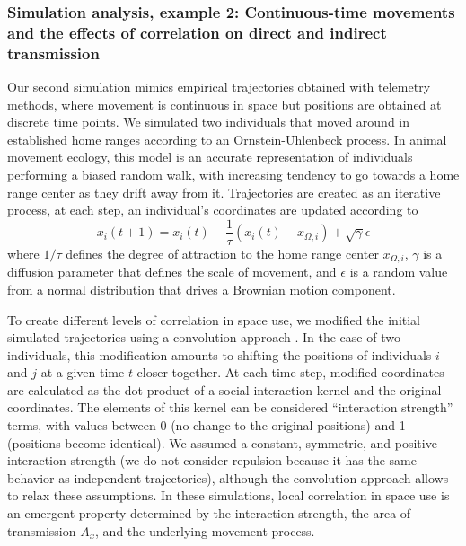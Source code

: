 \documentclass[letterpaper]{article}
\begin{document}
\subsubsection*{Simulation analysis, example 2: Continuous-time movements and the effects of correlation on direct and indirect transmission}

Our second simulation mimics empirical trajectories obtained with telemetry methods, where movement is continuous in space but positions are obtained at discrete time points. We simulated two individuals that moved around in established home ranges according to an Ornstein-Uhlenbeck process. In animal movement ecology, this model is an accurate representation of individuals performing a biased random walk, with increasing tendency to go towards a home range center as they drift away from it. Trajectories are created as an iterative process, at each step, an individual's coordinates are updated according to 
\begin{equation}
	x_i(t+1)=x_i(t)-\frac{1}{\tau}(x_i(t)-x_{\Omega,i})+\sqrt{\gamma}\epsilon
\end{equation}
where $1/\tau$ defines the degree of attraction to the home range center $x_{\Omega,i}$, $\gamma$ is a diffusion parameter that defines the scale of movement, and $\epsilon$ is a random value from a normal distribution that drives a Brownian motion component. 

To create different levels of correlation in space use, we modified the initial simulated trajectories using a convolution approach \citep{Scharf2018}. In the case of two individuals, this modification amounts to shifting the positions of individuals $i$ and $j$ at a given time $t$ closer together. At each time step, modified coordinates are calculated as the dot product of a social interaction kernel and the original coordinates. The elements of this kernel can be considered ``interaction strength'' terms, with values between 0 (no change to the original positions) and 1 (positions become identical). We assumed a constant, symmetric, and positive interaction strength (we do not consider repulsion because it has the same behavior as independent trajectories), although the convolution approach allows to relax these assumptions. In these simulations, local correlation in space use is an emergent property determined by the interaction strength, the area of transmission $A_x$, and the underlying movement process. %
\end{document}
